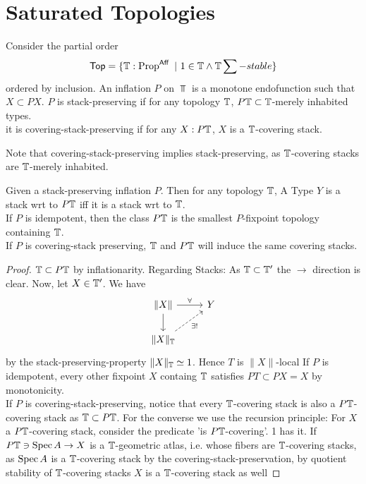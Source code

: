 

\section{Saturated Topologies}
\begin{definition}
	Consider the partial order
	\[
	\operatorname{\mathsf{Top}} = \{\mathbb{T} : \operatorname{Prop}^{\mathsf{Aff}} \ | \ 1 \in \mathbb{T} \land \mathbb{T} \sum-stable \}
	\]
	ordered by inclusion.
	An inflation $P$ on $\Top$ is a monotone endofunction such that $X \subset P X$. 
	$P$ is stack-preserving if for any topology $\mathbb{T}$, $P \mathbb{T} \subset \mathbb{T}$-merely inhabited types.\\
	it is covering-stack-preserving if for any $X : P \mathbb{T}$, $X$ is a $\mathbb{T}$-covering stack.
\end{definition}
Note that covering-stack-preserving implies stack-preserving, as $\mathbb{T}$-covering stacks are $\mathbb{T}$-merely inhabited.
\begin{prop}{\label{prop:TopologyMonad}}
	Given a stack-preserving inflation $P$. Then for any topology $\mathbb{T}$, A Type $Y$ is a stack wrt to $P \mathbb{T}$ iff it is a stack wrt to $\mathbb{T}$. \\
	If $P$ is idempotent, then the class $P \mathbb{T}$ is the smallest $P$-fixpoint topology containing $\mathbb{T}$. \\
	If $P$ is covering-stack preserving, $\mathbb{T}$ and $P \mathbb{T}$ will induce the same covering stacks.
\end{prop}

\begin{proof}
	$\mathbb{T} \subset P \mathbb{T}$ by inflationarity. 	Regarding Stacks: As $\mathbb{T} \subset \mathbb{T}'$ the $\rightarrow$ direction is clear. Now, let $X \in \mathbb{T}'$. We have
	\[\begin{tikzcd}
		{\|X\|} & Y \\
		{\|X\|_\bT}
		\arrow["\forall", from=1-1, to=1-2]
		\arrow[from=1-1, to=2-1]
		\arrow["{\exists!}"', dashed, from=2-1, to=1-2]
	\end{tikzcd}\]
	by the stack-preserving-property $\|X\|_{\mathbb{T}}  \simeq 1$. Hence $T$ is $\|X\|$-local	
	If $P$ is idempotent, every other fixpoint $X$ containg $\mathbb{T}$ satisfies $P T \subset P X = X$ by monotonicity. \\
	If $P$ is covering-stack-preserving, notice that every $\mathbb{T}$-covering stack is also a $P \mathbb{T}$-covering stack as $\mathbb{T} \subset P \mathbb{T}$. For the converse we use the recursion principle: For $X$ a $P \mathbb{T}$-covering stack, consider the predicate 'is $P \mathbb{T}$-covering'. 1 has it. If $P \mathbb{T} \ni \operatorname{Spec} A \to X$ is a $\mathbb{T}$-geometric atlas, i.e. whose fibers are $\mathbb{T}$-covering stacks, as $\operatorname{Spec} A$ is a $\mathbb{T}$-covering stack by the covering-stack-preservation, by quotient stability of $\mathbb{T}$-covering stacks $X$ is a $\mathbb{T}$-covering stack as well
\end{proof}

